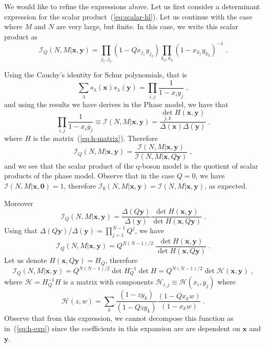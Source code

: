 \documentclass[a4paper,11pt]{amsart}
\begin{document}
We would like to refine the expressions above.  Let us first consider
a determinant expression for the scalar product~(\ref{eq:scalar-hl}).
Let us continue with the case where \(M\) and \(N\) are very large,
but finite. In this case, we write this scalar product as
\begin{equation}
  \mathcal{I}_Q(N,M | \bm{x}, \bm{y})  
= \prod_{j_1, j_2} (1-Q x_{j_1} y_{j_2}) \prod_{k_2, k_2}(1 - x_{k_1} y_{k_2})^{-1}\; .
\end{equation}

Using the Cauchy's identity for Schur polynomials, that is 
\begin{equation}
  \sum_\lambda s_\lambda(\bm{x}) s_\lambda(\bm{y}) = \prod_{i,j} \frac{1}{1 - x_i y_j}\; ,
\end{equation}
and using the results we have derives in the Phase model, we have that 
\begin{equation}
  \prod_{i,j}\frac{1}{1 - x_i y_j}  \equiv \mathcal{I}(N,M|\bm{x}, \bm{y}) = 
  \frac{\det_{j,k}H(\bm{x},\bm{y})}{\Delta(\bm{x}) \Delta(\bm{y})}\; .
\end{equation}
where \(H\) is the matrix~(\ref{eq:h-matrix}). Therefore
\begin{equation}
  \mathcal{I}_Q(N,M | \bm{x}, \bm{y})  
= \frac{\mathcal{I}(N,M|\bm{x}, \bm{y})}{\mathcal{I}(N,M|\bm{x}, Q\bm{y})}\; , 
\end{equation}
and we see that the scalar product of the q-boson model is the quotient of 
scalar products of the phase model. Observe that in the case \(Q = 0\), we have 
\(\mathcal{I}(N, M| \bm{x}, \bm{0}) = 1\), therefore
\(\mathcal{I}_0(N,M | \bm{x}, \bm{y}) = \mathcal{I}(N,M | \bm{x}, \bm{y})\), 
as expected. 

Moreover
\begin{equation}
  \mathcal{I}_Q(N,M | \bm{x}, \bm{y})  
  = \frac{\Delta(Q\bm{y})}{\Delta(\bm{y})}
  \frac{\det H(\bm{x}, \bm{y})}{\det H(\bm{x},Q \bm{y})} \; .
\end{equation}
Using that \(\Delta(Q\bm{y})/ \Delta(\bm{y}) = \prod_{j=1}^{N-1} Q^j\), we have 
\begin{equation}
  \mathcal{I}_Q(N,M | \bm{x}, \bm{y}) =  Q^{N(N-1)/2}\;
  \frac{\det H(\bm{x}, \bm{y})}{\det H(\bm{x}, Q \bm{y})} \; .
\end{equation}
Let us denote \(H(\bm{x}, Q\bm{y}) = H_{Q}\), therefore
\begin{equation}
  \mathcal{I}_Q(N,M | \bm{x}, \bm{y}) = Q^{N(N-1)/2} \det H_{Q}^{-1} \det H
= Q^{N(N-1)/2} \det \mathcal{H}(\bm{x}, \bm{y}) \; ,
\end{equation}
where \(\mathcal{H} = H_{Q}^{-1} H\) is a matrix with components 
\(\mathcal{H}_{i,j} \equiv \mathcal{H}(x_i, y_j)\) where
\begin{equation}
  \mathcal{H}(z, w) = \sum_{k} \frac{(1 - z y_k)}{(1 - Q z y_k)} 
\frac{(1 - Q x_k w)}{(1 - x_k w)}\; .
\end{equation}
Observe that from this expression, we cannot decompose this function
as in~(\ref{eq:h-exp}) since the coefficients in this expansion are 
are dependent on \(\bm{x}\) and \(\bm{y}\).
\end{document}
